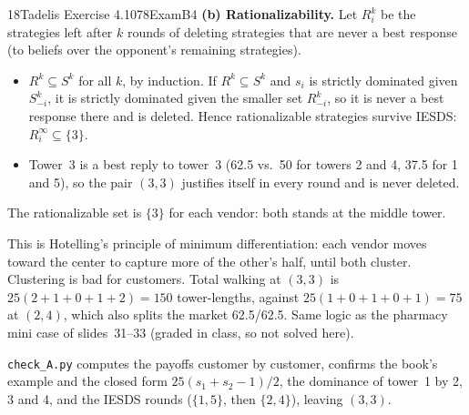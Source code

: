 \begin{exsol}{18}{Tadelis Exercise 4.10}{78}{Exam}{B4}
\textbf{(b) Rationalizability.} Let $R_i^k$ be the strategies left after $k$ rounds of deleting
strategies that are never a best response (to beliefs over the opponent's remaining strategies).
\begin{itemize}
  \item $R^k \subseteq S^k$ for all $k$, by induction. If $R^k \subseteq S^k$ and $s_i$ is strictly
  dominated given $S_{-i}^k$, it is strictly dominated given the smaller set $R_{-i}^k$, so it is
  never a best response there and is deleted. Hence rationalizable strategies survive IESDS:
  $R_i^\infty \subseteq \{3\}$.
  \item Tower~3 is a best reply to tower~3 (62.5 vs.\ 50 for towers 2 and 4, 37.5 for 1 and 5), so
  the pair $(3,3)$ justifies itself in every round and is never deleted.
\end{itemize}
The rationalizable set is $\{3\}$ for each vendor: both stands at the middle tower.

\interp This is Hotelling's principle of minimum differentiation: each vendor moves toward the
center to capture more of the other's half, until both cluster. Clustering is bad for customers.
Total walking at $(3,3)$ is $25(2+1+0+1+2) = 150$ tower-lengths, against $25(1+0+1+0+1) = 75$ at
$(2,4)$, which also splits the market 62.5/62.5. Same logic as the pharmacy mini case of
slides~31--33 (graded in class, so not solved here).

\verify \texttt{check\_A.py} computes the payoffs customer by customer, confirms the book's
example and the closed form $25(s_1+s_2-1)/2$, the dominance of tower~1 by 2, 3 and 4, and the
IESDS rounds ($\{1,5\}$, then $\{2,4\}$), leaving $(3,3)$.

\end{exsol}
